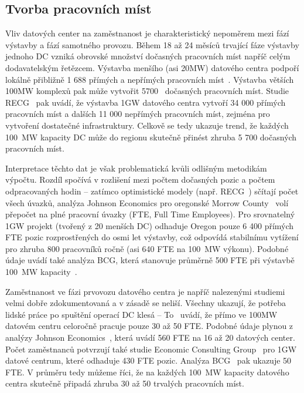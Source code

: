 \subsection{Tvorba pracovních míst}
\label{subsec:zamestnanost}

Vliv datových center na zaměstnanost je charakteristický nepoměrem mezi fází výstavby a fází samotného provozu. Během 18 až 24 měsíců trvající fáze výstavby jednoho DC vzniká obrovské množství dočasných pracovních míst napříč celým dodavatelským řetězcem. Výstavba menšího (asi 20MW) datového centra podpoří lokálně přibližně 1 688 přímých a nepřímých pracovních míst~\cite[s.]{pham_data_2017}. Výstavba větších 100MW komplexů pak může vytvořit 5700~\cite[6]{to_albertas_2025} dočasných pracovních míst. Studie RECG~\cite[s.~1]{diao_economic_2025} pak uvádí, že výstavba 1GW datového centra vytvoří 34 000 přímých pracovních míst a dalších 11 000 nepřímých pracovních míst, zejména pro vytvoření dostatečné infrastruktury. Celkově se tedy ukazuje trend, že každých 100~MW kapacity DC může do regionu skutečně přinést zhruba 5 700 dočasných pracovních míst.

Interpretace těchto dat je však problematická kvůli odlišným metodikám výpočtu. Rozdíl spočívá v rozlišení mezi počtem dočasných pozic a počtem odpracovaných hodin -- zatímco optimistické modely (např. RECG~\cite{diao_economic_2025}) sčítají počet všech úvazků, analýza Johnson Economics pro oregonské Morrow County~\cite{johnson_economics_economic_2025} volí přepočet na plné pracovní úvazky (FTE, Full Time Employees). Pro srovnatelný 1GW projekt (tvořený z 20 menších DC) odhaduje Oregon pouze 6 400 přímých FTE pozic rozprostřených do osmi let výstavby, což odpovídá stabilnímu vytížení pro zhruba 800 pracovníků ročně (asi 640 FTE na 100~MW výkonu). Podobné údaje uvádí také analýza BCG, která stanovuje průměrně 500 FTE při výstavbě 100~MW kapacity~\cite[s.~10]{lee_breaking_2025}.

Zaměstnanost ve fázi prvovozu datového centra je napříč nalezenými studiemi velmi dobře zdokumentovaná a v zásadě se neliší. Všechny ukazují, že potřeba lidské práce po spuštění operací DC klesá -- To~\cite[s.~7]{to_albertas_2025} uvádí, že přímo ve 100MW datovém centru celoročně pracuje pouze 30 až 50 FTE. Podobné údaje plynou z analýzy Johnson Economics~\cite[s.~15]{johnson_economics_economic_2025}, která uvádí 560 FTE na 16 až 20 datových center. Počet zaměstnanců potvrzují také studie Economic Consulting Group~\cite[s.~14]{diao_economic_2025} pro 1GW datové centrum, které odhaduje 430 FTE pozic. Analýza BCG~\cite[s.~10]{lee_breaking_2025} pak ukazuje 50 FTE. V průměru tedy můžeme říci, že na každých 100~MW kapacity datového centra skutečně připadá zhruba 30 až 50 trvalých pracovních míst.

